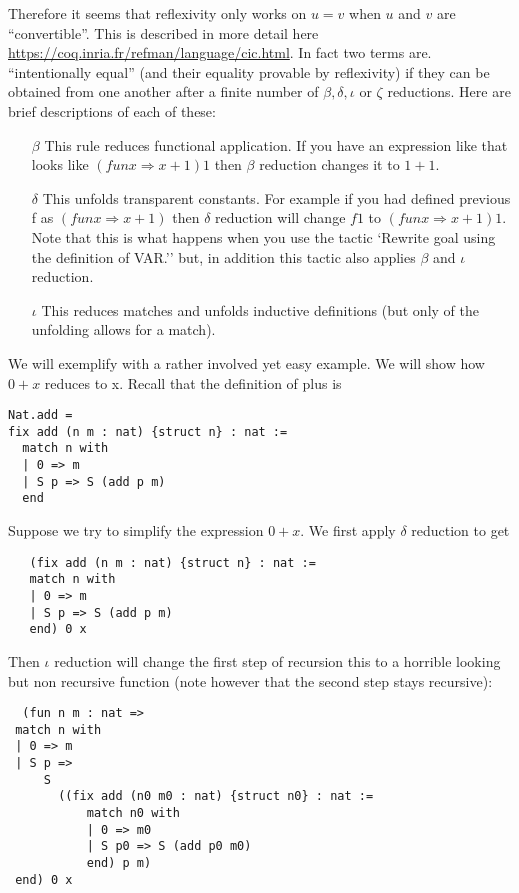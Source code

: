 Therefore it seems that reflexivity only works  on $u=v$ when $u$ and $v$ are ``convertible''. This is described in more detail here \url{https://coq.inria.fr/refman/language/cic.html}. In  fact two terms are. ``intentionally equal'' (and their equality provable by reflexivity) if they can be obtained from one another after a finite  number of $\beta, \delta, \iota$ or $\zeta$ reductions. Here are brief descriptions of each of these:
\begin{itemize}
\item[{\bf$\beta$}]This rule reduces functional application. If you have an expression like that looks like $(fun x \Rightarrow x+1) 1$ then $\beta$ reduction changes it to $1+1$.
\item[{\bf$\delta$}] This unfolds  transparent constants. For example if you had defined previous f as $(fun x \Rightarrow x+1)$ then $\delta$ reduction will change $f 1$ to $(fun x \Rightarrow x+1) 1$. Note that this is what happens when you use the tactic `Rewrite goal using the definition of VAR.'' but, in addition this tactic also applies $\beta$  and $\iota$ reduction.
\item[{\bf$\iota$}] This reduces   matches and unfolds inductive definitions (but only of the unfolding allows for a match). 

\end{itemize}
We will exemplify with a rather involved yet easy example. We will show how  $0+x$ reduces to x. Recall that the definition of plus is
\begin{verbatim}
Nat.add = 
fix add (n m : nat) {struct n} : nat :=
  match n with
  | 0 => m
  | S p => S (add p m)
  end
  \end{verbatim}
  
  Suppose we try to simplify the expression $0+x$. We first apply $\delta$ reduction to get 
  \begin{verbatim}
   (fix add (n m : nat) {struct n} : nat :=
   match n with
   | 0 => m
   | S p => S (add p m)
   end) 0 x
    \end{verbatim}
  
  Then $\iota$ reduction will change  the first step of recursion this to a horrible looking but non recursive function (note however that the second step stays recursive):
 \begin{verbatim} 
  (fun n m : nat =>
 match n with
 | 0 => m
 | S p =>
     S
       ((fix add (n0 m0 : nat) {struct n0} : nat :=
           match n0 with
           | 0 => m0
           | S p0 => S (add p0 m0)
           end) p m)
 end) 0 x
 
  \end{verbatim}
  
